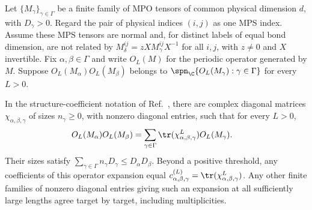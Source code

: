 \begin{lemma}
    \label{thm:asym_operator_coefficients}
    \leanok
    Let $\{M_\gamma\}_{\gamma\in\Gamma}$ be a finite family of MPO
    tensors of common physical dimension $d$, with $D_\gamma>0$. Regard the pair of physical indices
    $(i,j)$ as one MPS index. Assume these MPS tensors are normal and,
    for distinct labels of equal bond dimension, are not related by
    $M_\delta^{ij}=zXM_\gamma^{ij}X^{-1}$ for all $i,j$, with $z\neq0$
    and $X$ invertible. Fix $\alpha,\beta\in\Gamma$ and write $O_L(M)$
    for the periodic operator generated by $M$. Suppose
    $O_L(M_\alpha)O_L(M_\beta)$ belongs to
    $\spn_{\C}\{O_L(M_\gamma):\gamma\in\Gamma\}$ for every $L>0$.

    In the structure-coefficient notation of
    Ref.~\cite[Section~4.5]{Cirac2016MPDO_arXiv}, there are complex diagonal
    matrices $\chi_{\alpha,\beta,\gamma}$ of sizes $n_\gamma\geq0$, with
    nonzero diagonal entries, such that for every $L>0$,
    \begin{align}
        O_L(M_\alpha)O_L(M_\beta)
         & =\sum_{\gamma\in\Gamma}
        \tr(\chi_{\alpha,\beta,\gamma}^{L})O_L(M_\gamma).
        \label{eq:asym_operator_expansion}
    \end{align}
    Their sizes satisfy $\sum_{\gamma\in\Gamma}n_\gamma D_\gamma
        \leq D_\alpha D_\beta$.
    Beyond a positive threshold, any coefficients of this operator
    expansion equal $c_{\alpha,\beta,\gamma}^{(L)}
        =\tr(\chi_{\alpha,\beta,\gamma}^{L})$.
    Any other finite families of nonzero diagonal entries giving such an
    expansion at all sufficiently large lengths agree target by target,
    including multiplicities.
\end{lemma}

